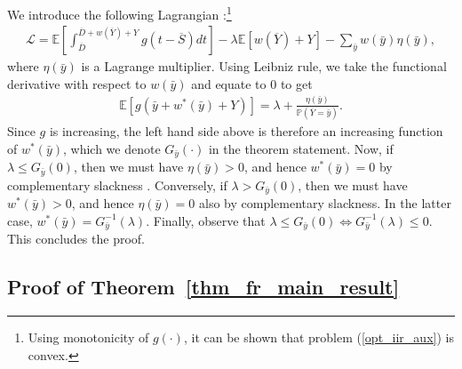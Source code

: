 \documentclass[12pt,journal,onecolumn]{IEEEtran}
\begin{document}
We introduce the following Lagrangian \cite{boyd}:\footnote{Using monotonicity of $g(\cdot)$, it can be shown that problem (\ref{opt_iir_aux}) is convex.}
\begin{align}
\mathcal{L}=\mathbb{E}\left[\int_{\overline{D}}^{\overline{D}+w\left(\overline{Y}\right)+Y}g\left(t-\overline{S}\right)dt\right]-\lambda\mathbb{E}\left[w\left(\overline{Y}\right)+Y\right]-\sum_{\bar{y}}w(\bar{y})\eta(\bar{y}),
\end{align}
where $\eta(\bar{y})$ is a Lagrange multiplier. Using Leibniz rule, we take the functional derivative with respect to $w(\bar{y})$ and equate to $0$ to get
\begin{align}
\mathbb{E}\left[g\left(\bar{y}+w^*(\bar{y})+Y\right)\right]=\lambda+\frac{\eta(\bar{y})}{\mathbb{P}\left(\overline{Y}=\bar{y}\right)}.
\end{align}
Since $g$ is increasing, the left hand side above is therefore an increasing function of $w^*(\bar{y})$, which we denote $G_{\bar{y}}\left(\cdot\right)$ in the theorem statement. Now, if $\lambda\leq G_{\bar{y}}(0)$, then we must have $\eta(\bar{y})>0$, and hence $w^*(\bar{y})=0$ by complementary slackness \cite{boyd}. Conversely, if $\lambda> G_{\bar{y}}(0)$, then we must have $w^*(\bar{y})>0$, and hence $\eta(\bar{y})=0$ also by complementary slackness. In the latter case, $w^*(\bar{y})=G_{\bar{y}}^{-1}(\lambda)$. Finally, observe that $\lambda\leq G_{\bar{y}}(0)\iff G_{\bar{y}}^{-1}(\lambda)\leq0$. This concludes the proof.


\subsection{Proof of Theorem~\ref{thm_fr_main_result}} \label{apndx_pf_fr_main_result}
\end{document}
